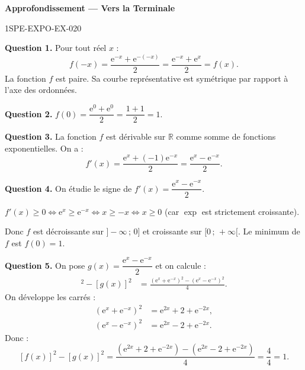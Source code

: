 \begin{center}\textbf{Approfondissement — Vers la Terminale}\end{center}
\begin{corrige}{1SPE-EXPO-EX-020}

\textbf{Question 1.} Pour tout réel $x$ :
\[
f(-x) = \frac{\mathrm{e}^{-x} + \mathrm{e}^{-(-x)}}{2} = \frac{\mathrm{e}^{-x} + \mathrm{e}^x}{2} = f(x).
\]
La fonction $f$ est paire. Sa courbe représentative est symétrique par rapport à l'axe des ordonnées.

\textbf{Question 2.} $f(0) = \dfrac{\mathrm{e}^0 + \mathrm{e}^0}{2} = \dfrac{1+1}{2} = 1$.

\textbf{Question 3.} La fonction $f$ est dérivable sur $\mathbb{R}$ comme somme de fonctions exponentielles. On a :
\[
f'(x) = \frac{\mathrm{e}^x + (-1)\mathrm{e}^{-x}}{2} = \frac{\mathrm{e}^x - \mathrm{e}^{-x}}{2}.
\]

\textbf{Question 4.} On étudie le signe de $f'(x) = \dfrac{\mathrm{e}^x - \mathrm{e}^{-x}}{2}$.

$f'(x) \geqslant 0 \iff \mathrm{e}^x \geqslant \mathrm{e}^{-x} \iff x \geqslant -x \iff x \geqslant 0$ (car $\exp$ est strictement croissante).

Donc $f$ est décroissante sur $]-\infty\,;\,0]$ et croissante sur $[0\,;\,+\infty[$. Le minimum de $f$ est $f(0) = 1$.

\textbf{Question 5.} On pose $g(x) = \dfrac{\mathrm{e}^x - \mathrm{e}^{-x}}{2}$ et on calcule :
\begin{align*}
[f(x)]^2 - [g(x)]^2 &= \frac{(\mathrm{e}^x + \mathrm{e}^{-x})^2 - (\mathrm{e}^x - \mathrm{e}^{-x})^2}{4}.
\end{align*}
On développe les carrés :
\begin{align*}
(\mathrm{e}^x + \mathrm{e}^{-x})^2 &= \mathrm{e}^{2x} + 2 + \mathrm{e}^{-2x}, \\
(\mathrm{e}^x - \mathrm{e}^{-x})^2 &= \mathrm{e}^{2x} - 2 + \mathrm{e}^{-2x}.
\end{align*}
Donc :
\[
[f(x)]^2 - [g(x)]^2 = \frac{(\mathrm{e}^{2x} + 2 + \mathrm{e}^{-2x}) - (\mathrm{e}^{2x} - 2 + \mathrm{e}^{-2x})}{4} = \frac{4}{4} = 1.
\]
\end{corrige}
